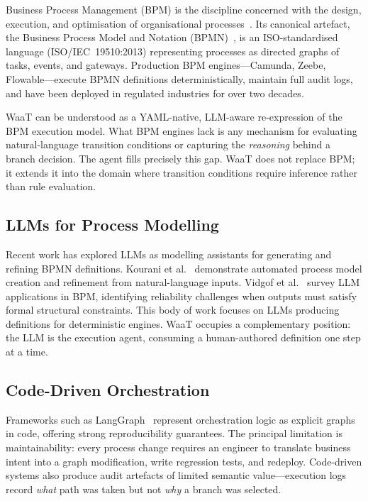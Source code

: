 \documentclass[10pt,conference]{IEEEtran}
\begin{document}
Business Process Management (BPM) is the discipline concerned with
the design, execution, and optimisation of organisational
processes~\cite{dumas2018fundamentals}.  Its canonical artefact,
the Business Process Model and Notation
(BPMN)~\cite{omg2013bpmn}, is an ISO-standardised language
(ISO/IEC~19510:2013) representing processes as directed graphs of
tasks, events, and gateways.  Production BPM engines---Camunda,
Zeebe, Flowable---execute BPMN definitions deterministically,
maintain full audit logs, and have been deployed in regulated
industries for over two decades.

WaaT can be understood as a YAML-native, LLM-aware re-expression
of the BPM execution model.  What BPM engines lack is any
mechanism for evaluating natural-language transition conditions or
capturing the \emph{reasoning} behind a branch decision.  The
agent fills precisely this gap.  WaaT does not replace BPM; it
extends it into the domain where transition conditions require
inference rather than rule evaluation.

\subsection{LLMs for Process Modelling}

Recent work has explored LLMs as modelling assistants for
generating and refining BPMN definitions.  Kourani et
al.~\cite{kourani2024promoai} demonstrate automated process model
creation and refinement from natural-language inputs.
Vidgof et al.~\cite{vidgof2023bpm} survey LLM applications in
BPM, identifying reliability challenges when outputs must satisfy
formal structural constraints.  This body of work focuses on LLMs
producing definitions for deterministic engines.  WaaT occupies a
complementary position: the LLM is the execution agent, consuming
a human-authored definition one step at a time.

\subsection{Code-Driven Orchestration}

Frameworks such as LangGraph~\cite{langgraph2024} represent
orchestration logic as explicit graphs in code, offering strong
reproducibility guarantees.  The principal limitation is
maintainability: every process change requires an engineer to
translate business intent into a graph modification, write
regression tests, and redeploy.  Code-driven systems also produce
audit artefacts of limited semantic value---execution logs record
\emph{what} path was taken but not \emph{why} a branch was
selected.
\end{document}
